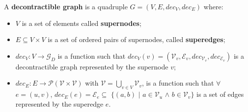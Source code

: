 \begin{minipage}[t]{\textwidth}
    {\tiny
    \begin{definizione}
    A \textbf{decontractible graph} is a quadruple $G = (V, E, dec_V, dec_E)$ where:
    \begin{itemize}
        \item $V$ is a set of elements called \textbf{supernodes};
        \item $E \subseteq V \times V$ is a set of ordered pairs of supernodes, called \textbf{superedges};
        \item $dec_V : V \rightarrow \mathcal{G}_D$ is a function such that $dec_V(v) = (\mathcal{V}_v,
            \mathcal{E}_v, dec_{\mathcal{V}_v}, dec_{\mathcal{E}_v})$ is a decontractible graph represented
            by the supernode $v$;
        \item $dec_E : E \rightarrow \mathcal{P}(\mathcal{V} \times \mathcal{V})$ with $\mathcal{V} = \bigcup_{v \in V}\mathcal{V}_v$,
            is a function such that $\forall$ $ e = (u, v)$, $dec_E(e) = \mathcal{E}_e \subseteq$ $\{(a, b)$ $\mid$ $a \in \mathcal{V}_u$ $\wedge$
            $b \in \mathcal{V}_v\}$ is a set of edges represented by the superedge $e$.
    \end{itemize}
    \end{definizione}}
\end{minipage}